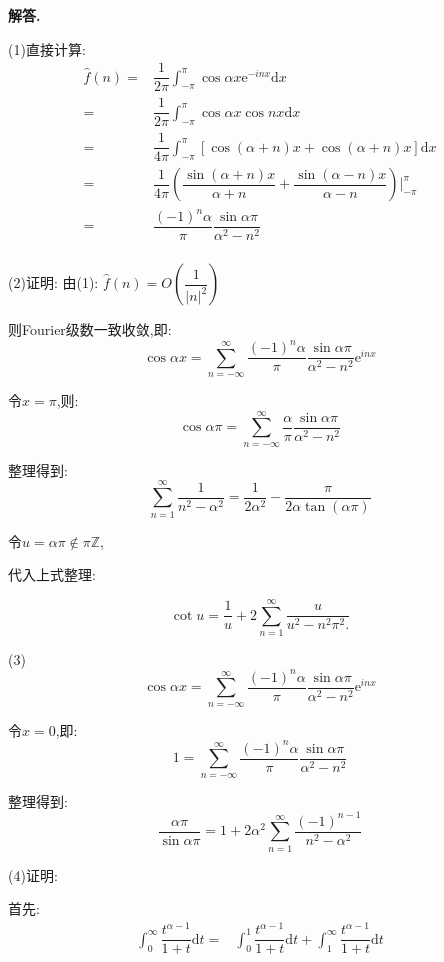 \documentclass[12pt, a4paper, oneside]{ctexart}
\newenvironment{solution}{\par\noindent\textbf{解答. }}{\par}
\begin{document}
\begin{solution}
\par
(1)直接计算:
$$
\begin{aligned}
\hat{f}(n)=&\dfrac{1}{2\pi}\int_{-\pi}^{\pi}\cos \alpha x \mathrm{e}^{-inx}\mathrm{d}x\\
=&\dfrac{1}{2\pi}\int_{-\pi}^{\pi}\cos \alpha x \cos nx\mathrm{d}x\\
=&\dfrac{1}{4\pi}\int_{-\pi}^{\pi}[\cos (\alpha +n)x +\cos (\alpha +n)x]\mathrm{d}x\\
=&\dfrac{1}{4\pi}\left(\dfrac{\sin (\alpha +n)x}{\alpha+n} +\dfrac{\sin (\alpha -n)x}{\alpha-n}\right)\bigg|^\pi_{-\pi}\\
=&\dfrac{(-1)^n\alpha}{\pi}\dfrac{\sin \alpha \pi}{\alpha^2-n^2}\\
\end{aligned}
$$
\par
(2)证明: 由(1): $\hat{f}(n)=O\left(\dfrac{1}{|n|^2}\right)$
\par
则Fourier级数一致收敛,即:
$$
\cos \alpha x =\sum_{n=-\infty}^{\infty}\dfrac{(-1)^n\alpha}{\pi}\dfrac{\sin \alpha \pi}{\alpha^2-n^2}\mathrm{e}^{inx}
$$
\par
令$x=\pi$,则:
$$
\cos \alpha \pi=\sum_{n=-\infty}^{\infty}\dfrac{\alpha}{\pi}\dfrac{\sin \alpha \pi}{\alpha^2-n^2}
$$
\par
整理得到:
$$
\sum_{n=1}^{\infty}\dfrac{1}{n^2-\alpha^2}=\dfrac{1}{2\alpha^2}-\dfrac{\pi}{2\alpha\tan(\alpha \pi)}
$$
\par
令$u=\alpha \pi \notin \pi \mathbb{Z}$,
\par
代入上式整理:
\par
$$
   \cot u=\dfrac{1}{u}+2\sum_{n=1}^{\infty}\dfrac{u}{u^2-n^2\pi^2.}
$$
\par
(3)
$$
\cos \alpha x =\sum_{n=-\infty}^{\infty}\dfrac{(-1)^n\alpha}{\pi}\dfrac{\sin \alpha \pi}{\alpha^2-n^2}\mathrm{e}^{inx}
$$
\par
令$x=0$,即:
$$
1=\sum_{n=-\infty}^{\infty}\dfrac{(-1)^n\alpha}{\pi}\dfrac{\sin \alpha \pi}{\alpha^2-n^2}
$$
\par
整理得到:
$$
\dfrac{\alpha \pi}{\sin \alpha \pi}=1+2\alpha^2\sum_{n=1}^{\infty}\dfrac{(-1)^{n-1}}{n^2-\alpha^2}
$$
\par
(4)证明:
\par
首先:
$$
\begin{aligned}
\int_{0}^{\infty}\dfrac{t^{\alpha-1}}{1+t}\mathrm{d}t
=&\int_{0}^{1}\dfrac{t^{\alpha-1}}{1+t}\mathrm{d}t
+\int_{1}^{\infty}\dfrac{t^{\alpha-1}}{1+t}\mathrm{d}t\\

\end{aligned}$$
\end{solution}
\end{document}
